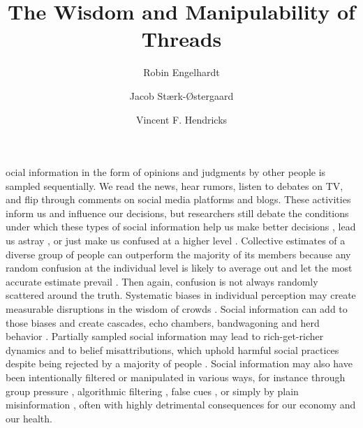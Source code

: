 \documentclass[9pt,twocolumn,twoside,lineno]{pnas-new}
\title{The Wisdom and Manipulability of Threads}
\author[a,1]{Robin Engelhardt}
\author[a]{Jacob Stærk-Østergaard}
\author[a]{Vincent F. Hendricks}
\affil[a]{Center for Information and Bubble Studies, Department of Communication, University of Copenhagen, Karen Blixens Plads 8, DK-2300 Copenhagen S.}
\begin{document}
\maketitle
\thispagestyle{firststyle}

ocial information in the form of opinions and judgments by other people is sampled sequentially. We read the news, hear rumors, listen to debates on TV, and flip through comments on social media platforms and blogs. These activities inform us and influence our decisions, but researchers still debate the conditions under which these types of social information help us make better decisions \cite{woolley2010evidence, gurccay2015power, becker2017network, jayles2017social}, lead us astray \cite{caplan2011myth, lorenz2011social, minson2012cost, king2011true, le2018endogenous}, or just make us confused at a higher level \cite{salganik2006experimental, salganik2009web}. Collective estimates of a diverse group of people can outperform the majority of its members because any random confusion at the individual level is likely to average out and let the most accurate estimate prevail \cite{galton1907vox, muth1961rational, surowiecki2005wisdom, hong2008some}. Then again, confusion is not always randomly scattered around the truth. Systematic biases in individual perception may create measurable disruptions in the wisdom of crowds \cite{izard2008calibrating, nash2014curious, kao2018counteracting}. Social information can add to those biases and create cascades, echo chambers, bandwagoning and herd behavior \cite{anderson1997information, bikhchandani1992theory, bakshy2015exposure, banerjee1992simple}. Partially sampled social information may lead to rich-get-richer dynamics \cite{barabasi1999emergence} and to belief misattributions, which uphold harmful social practices despite being rejected by a majority of people \cite{katz1931students, darley1968bystander, ross1977false, noelle1974spiral, lee2019homophily}. Social information may also have been intentionally filtered or manipulated in various ways, for instance through group pressure \cite{asch1951effects}, algorithmic filtering \cite{pariser2011filter}, false cues \cite{salganik2006experimental, muchnik2013social, hanson1996hits}, or simply by plain misinformation \cite{hendricks2018reality}, often with highly detrimental consequences for our economy and our health.
\end{document}
